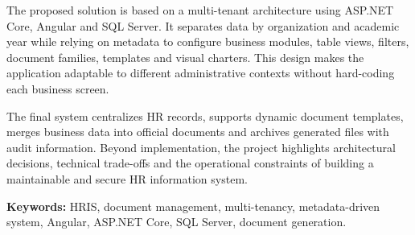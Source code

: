 The proposed solution is based on a multi-tenant architecture using ASP.NET Core, Angular and SQL Server. It separates data by organization and academic year while relying on metadata to configure business modules, table views, filters, document families, templates and visual charters. This design makes the application adaptable to different administrative contexts without hard-coding each business screen.

The final system centralizes HR records, supports dynamic document templates, merges business data into official documents and archives generated files with audit information. Beyond implementation, the project highlights architectural decisions, technical trade-offs and the operational constraints of building a maintainable and secure HR information system.

\textbf{Keywords:} HRIS, document management, multi-tenancy, metadata-driven system, Angular, ASP.NET Core, SQL Server, document generation.
